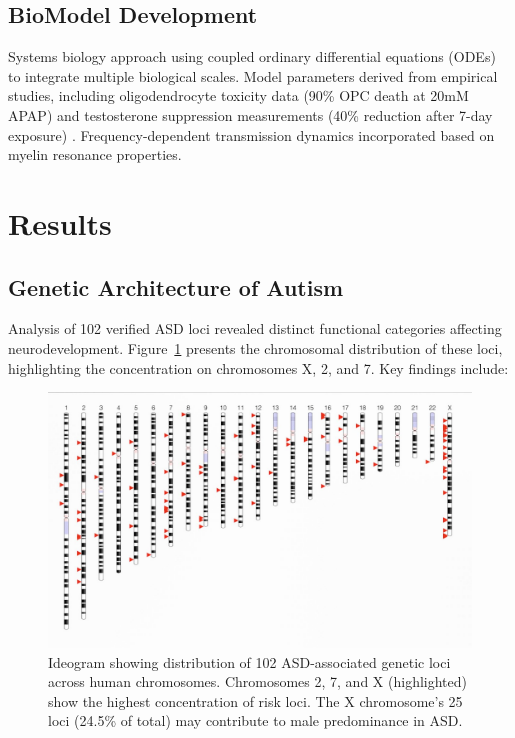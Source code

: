 \documentclass[12pt]{article}
\begin{document}
\subsection{BioModel Development}
Systems biology approach using coupled ordinary differential equations (ODEs) to integrate multiple biological scales. Model parameters derived from empirical studies, including oligodendrocyte toxicity data (90\% OPC death at 20mM APAP) \citep{perez2012} and testosterone suppression measurements (40\% reduction after 7-day exposure) \citep{kristensen2016}. Frequency-dependent transmission dynamics incorporated based on myelin resonance properties.

\section{Results}

\subsection{Genetic Architecture of Autism}
Analysis of 102 verified ASD loci revealed distinct functional categories affecting neurodevelopment. Figure~\ref{fig:ideogram} presents the chromosomal distribution of these loci, highlighting the concentration on chromosomes X, 2, and 7. Key findings include:

\begin{figure}[h]
\centering
\includegraphics[width=\textwidth]{../assets/Autism-Ideogram.jpg}
\caption{Ideogram showing distribution of 102 ASD-associated genetic loci across human chromosomes. Chromosomes 2, 7, and X (highlighted) show the highest concentration of risk loci. The X chromosome's 25 loci (24.5\% of total) may contribute to male predominance in ASD.}
\label{fig:ideogram}
\end{figure}
\end{document}
